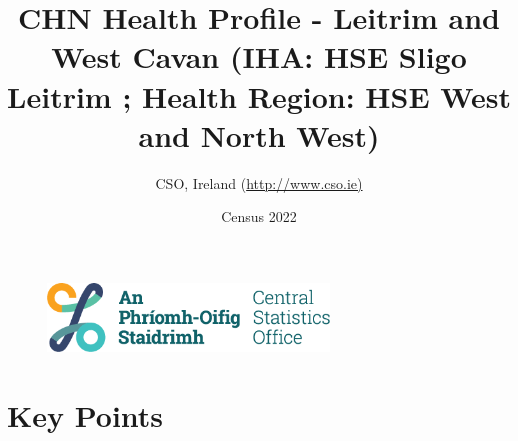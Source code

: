 \documentclass{article}
\title{CHN Health Profile - Leitrim and West Cavan (IHA: HSE Sligo Leitrim ;  Health Region: HSE West and North West) }
\date{Census 2022}
\author{CSO, Ireland  (\url{http://www.cso.ie)}}
\begin{document}


\begin{figure}
	\centering
\includegraphics[width =75mm]{../figures/CSO_Logo.png}
\end{figure}

				 
		   
						  
														  
																																													
												 
			 
\maketitle
					
													   
				 
						 
																																																																											   
				 
				  
  \pagebreak
    	    \tableofcontents

\pagebreak


\section{Key Points}
\end{document}
